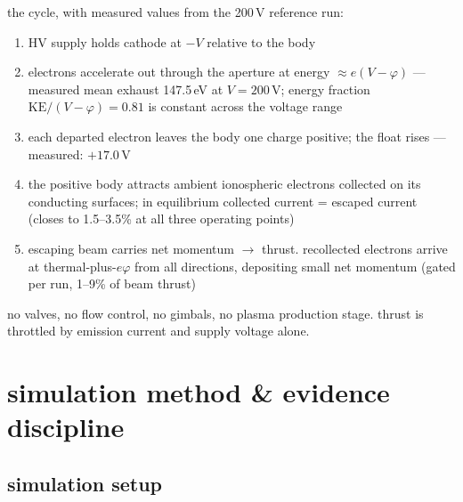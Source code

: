 \documentclass[11pt]{article}
\begin{document}
the cycle, with measured values from the 200\,V reference run:

\begin{enumerate}
  \item HV supply holds cathode at $-V$ relative to the body
  \item electrons accelerate out through the aperture at energy $\approx
        e(V-\varphi)$ --- measured mean exhaust 147.5\,eV at $V=200$\,V;
        energy fraction $\mathrm{KE}/(V-\varphi) = 0.81$ is constant across
        the voltage range
  \item each departed electron leaves the body one charge positive; the float
        rises --- measured: $+17.0$\,V
  \item the positive body attracts ambient ionospheric electrons collected on
        its conducting surfaces; in equilibrium collected current = escaped
        current (closes to 1.5--3.5\% at all three operating points)
  \item escaping beam carries net momentum $\to$ thrust.  recollected electrons
        arrive at thermal-plus-$e\varphi$ from all directions, depositing small
        net momentum (gated per run, 1--9\% of beam thrust)
\end{enumerate}

no valves, no flow control, no gimbals, no plasma production stage.  thrust is
throttled by emission current and supply voltage alone.

\section{simulation method \& evidence discipline}

\subsection{simulation setup}
\end{document}
